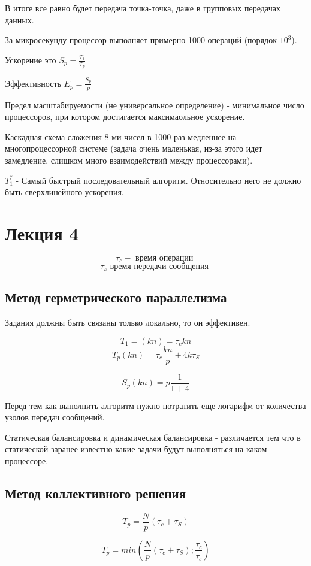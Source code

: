 \documentclass[14pt]{extarticle}
\begin{document}
В итоге все равно будет передача точка-точка, даже в групповых передачах данных.

За микросекунду процессор выполняет примерно 1000 операций (порядок $ 10^3 $). 

Ускорение это $ S_p = \frac{T_1}{T_p}  $

Эффективность $ E_p = \frac{S_p }{p} $

Предел масштабируемости (не универсальное определение) - минимальное число процессоров, при котором достигается максимаольное ускорение.

Каскадная схема сложения 8-ми чисел в 1000 раз медленнее на многопроцессорной системе (задача очень маленькая, из-за этого идет замедление, слишком много взаимодействий между процессорами).

$ T_1^* $ - Самый быстрый последовательный алгоритм. Относительно него не должно быть сверхлинейного ускорения.

\section{Лекция 4}

\[ \tau_c - \textrm{ время операции } \]
\[ \tau_s \textrm{ время передачи сообщения } \]

\subsection{Метод герметрического параллелизма}

Задания должны быть связаны только локально, то он эффективен.

\[ T_1 =(kn) = \tau_c kn \]
\[ T_p(kn) = \tau_c \frac{kn}{p} + 4k \tau_S \]

\[ S_p (kn) = p \frac{1}{1+4}  \]

Перед тем как выполнить алгоритм нужно потратить еще логарифм от количества узолов передач сообщений.

Статическая балансировка и динамическая балансировка - различается тем что в статической заранее известно какие задачи будут выполняться на каком процессоре.

\subsection{Метод коллективного решения}

\[ T_p = \frac{N }{p}(\tau_c + \tau_S) \]

\[ T_p = min(\frac{N }{p}(\tau_c + \tau_S); \frac{\tau_c}{\tau_s}) \]
\end{document}
